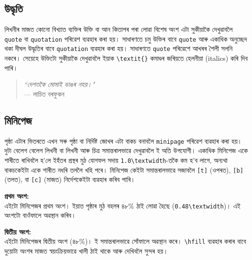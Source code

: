 \documentclass[12pt,a4paper]{article} %
\begin{document}
	\subsection{উদ্ধৃতি}
	
	লিখনীৰ মাজত কোনো বিখ্যাত ব্যক্তিৰ উক্তি বা আন কিতাপৰ পৰা লোৱা বিশেষ অংশ এটা সুকীয়াকৈ দেখুৱাবলৈ \texttt{quote} বা \texttt{quotation} পৰিৱেশ ব্যৱহাৰ কৰা হয়। সাধাৰণতে চমু উক্তিৰ বাবে \texttt{quote} আৰু একাধিক অনুচ্ছেদ থকা দীঘল উদ্ধৃতিৰ বাবে \texttt{quotation} ব্যৱহাৰ কৰা হয়। সাধাৰণতে \texttt{quote} পৰিৱেশে আখৰৰ শৈলী সলনি নকৰে। সেয়েহে উক্তিটো সুকীয়াকৈ দেখুৱাবলৈ ইয়াক \texttt{\textbackslash textit\{\}} কমাণ্ডৰ জৰিয়তে হেলনীয়া (italics) কৰি দিব পাৰি।
	\begin{quote}
		\textit{``দেশতকৈ মোমাই ডাঙৰ নহয়।"}\\
		--- লাচিত বৰফুকন
	\end{quote}
	
	\subsection{মিনিপেজ}
	
	পৃষ্ঠা এটাৰ ভিতৰতে এখন সৰু পৃষ্ঠা বা নিৰ্দিষ্ট জোখৰ এটা বাকচ বনাবলৈ \texttt{minipage} পৰিৱেশ ব্যৱহাৰ কৰা হয়। দুটা বেলেগ বেলেগ লিখনী বা লিখনী আৰু চিত্ৰ সমান্তৰালভাৱে দেখুৱাবলৈ ই অতি উপযোগী। একাধিক মিনিপেজ একে শাৰীতে ৰাখিবলৈ হ'লে ইহঁতৰ প্ৰস্থৰ মুঠ যোগফল সদায় \texttt{1.0\textbackslash textwidth}-তকৈ কম হ'ব লাগে, অন্যথা বাকচকেইটা একে শাৰীত নধৰি তললৈ খহি পৰে।	মিনিপেজ কেইটা সমান্তৰালভাৱে সজাবলৈ \texttt{[t]} (ওপৰত), \texttt{[b]} (তলত), বা \texttt{[c]} (মাজত) নিৰ্দেশকেইটা  ব্যৱহাৰ কৰিব পাৰি।
	
	\vspace{0.3cm}
	\noindent
	\begin{minipage}[t]{0.48\textwidth}
		\textbf{প্ৰথম অংশ:}\\
		এইটো মিনিপেজৰ প্ৰথম অংশ। ইয়াত পৃষ্ঠাৰ মুঠ বহলৰ ৪৮\% ঠাই লোৱা হৈছে (\texttt{0.48\textbackslash textwidth})। এই অংশটো বাওঁফালে অৱস্থান কৰিব।
	\end{minipage}
	\hfill
	\begin{minipage}[t]{0.48\textwidth}
		\textbf{দ্বিতীয় অংশ:}\\
		এইটো মিনিপেজৰ দ্বিতীয় অংশ (৪৮\%)। ই সমান্তৰালভাৱে সোঁফালে অৱস্থান কৰে। \texttt{\textbackslash hfill} ব্যৱহাৰ কৰাৰ বাবে দুয়োটা অংশৰ মাজত স্বয়ংক্ৰিয়ভাৱে খালী ঠাই থাকে আৰু দেখিবলৈ সুন্দৰ হয়।
	\end{minipage}
	\vspace{0.3cm}
	
\end{document}
